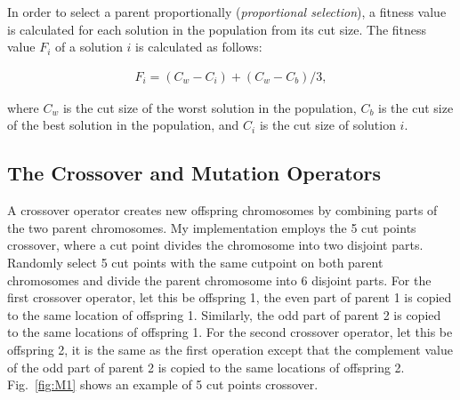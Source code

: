 \documentclass[11pt]{article}
\begin{document}
In order to select a parent proportionally (\textit{proportional selection}), a fitness value is
calculated for each solution in the population from its cut size. The fitness value \(F_i\) of a 
solution \(i\) is calculated as follows:

\begin{align*}
	F_i = (C_w - C_i) + (C_w - C_b) / 3,
\end{align*}

\noindent
where \(C_w\) is the cut size of the worst solution in the population, \(C_b\) is the cut size of 
the best solution in the population, and \(C_i\) is the cut size of solution \(i\).


\subsection{The Crossover and Mutation Operators}

A crossover operator creates new offspring chromosomes by combining parts of the two parent 
chromosomes. My implementation employs the 5 cut points crossover, where a cut point divides the 
chromosome into two disjoint parts. Randomly select 5 cut points with the same cutpoint on both 
parent chromosomes and divide the parent chromosome into 6 disjoint parts. For the first 
crossover operator, let this be offspring 1, the even part of parent 1 is copied to the same 
location of offspring 1. Similarly, the odd part of parent 2 is copied to the same locations
of offspring 1. For the second crossover operator, let this be offspring 2, it is the same as
the first operation except that the complement value of the odd part of parent 2 is copied to 
the same locations of offspring 2. Fig.~\ref{fig:M1} shows an example of 5 cut points crossover.
\end{document}
